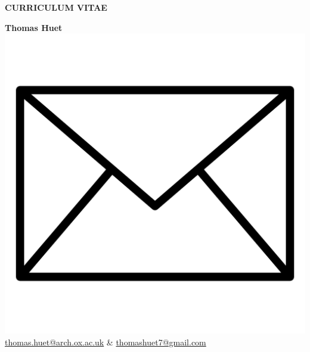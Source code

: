 \documentclass{article}
\begin{document}
\begin{adjustwidth}{50pt}{50pt}
    \begin{center}
    \large{\textbf{CURRICULUM VITAE}}\\
    \end{center}
\end{adjustwidth}
\bigbreak

\textbf{Thomas Huet} \\
\smallbreak
\includegraphics[scale=0.025]{gmail} \quad \href{mailto:thomas.huet@arch.ox.ac.uk}{thomas.huet@arch.ox.ac.uk} \& \href{mailto:thomashuet7@gmail.com}{thomashuet7@gmail.com}\\
\end{document}
